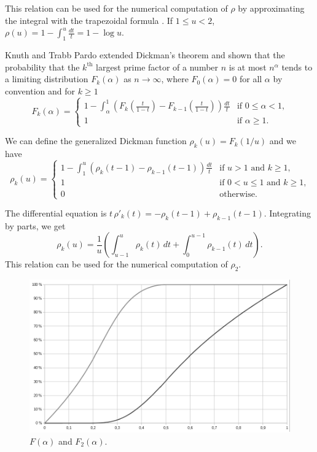 \documentclass[a4paper, 11pt, pdftex]{report}
\theoremstyle{plain}
\theoremstyle{definition}
\begin{document}
This relation can be used for the numerical computation of $\rho$ by approximating the integral
with the trapezoidal formula \cite{LuneWattel1}. If $1 \leq u < 2$,
$\rho(u) = 1 - \int_1^u \frac{dt}{t} = 1 - \log u$.

Knuth and Trabb Pardo \cite{KnuthPardo1} extended Dickman's theorem and shown that the
probability that the $k^\text{th}$ largest prime factor of a number $n$ is at most $n^\alpha$
tends to a limiting distribution $F_k(\alpha)$ as $n \to \infty$, where $F_0(\alpha) = 0$ for all
$\alpha$ by convention and for $k \geq 1$
\begin{equation*}
F_k(\alpha) = \begin{cases}
1 - \int_\alpha^1 \left( F_k(\frac{t}{1-t}) - F_{k-1}(\frac{t}{1-t}) \right) \frac{dt}{t} & \text{if } 0 \leq \alpha < 1 \text{,}\\
1& \text{if } \alpha \geq 1 \text{.}
\end{cases}
\end{equation*}

We can define the generalized Dickman function $\rho_k(u) = F_k(1/u)$ and we have
\begin{equation*}
\rho_k(u) = \begin{cases}
1 - \int_1^u \left( \rho_k(t - 1) - \rho_{k-1}(t - 1) \right) \frac{dt}{t}
  & \text{if } u > 1 \text{ and } k\geq 1\text{,}\\
1& \text{if } 0 < u \leq 1 \text{ and } k\geq 1\text{,}\\
0& \text{otherwise.}
\end{cases}
\end{equation*}

The differential equation is $t\, \rho'_k(t) = -\rho_k(t - 1) + \rho_{k-1}(t - 1)$.
Integrating by parts, we get
$$\rho_k(u) = \frac{1}{u} \left( \int_{u-1}^u \rho_k(t)\, dt + \int_0^{u-1} \rho_{k-1}(t)\, dt \right).$$
This relation can be used for the numerical computation of $\rho_2$.

\begin{figure}[!h]
	\centering
	\includegraphics[width=16cm, angle=0]{F_12.pdf}
	\caption{\label{fig:F_12} $F(\alpha)$ and $F_2(\alpha)$.}
\end{figure}
\end{document}
